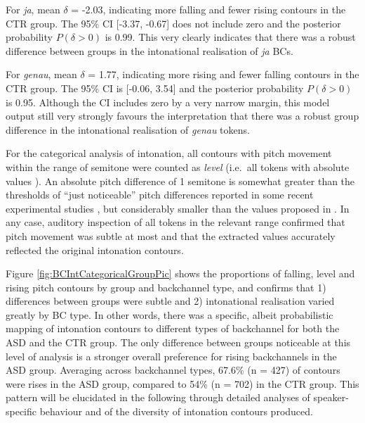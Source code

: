 For \emph{ja}, mean \(\delta\) = -2.03, indicating more falling and fewer rising contours in the CTR group. The 95\% CI {[}-3.37, -0.67{]} does not include zero and the posterior probability \(P(\delta > 0)\) is 0.99. This very clearly indicates that there was a robust difference between groups in the intonational realisation of \emph{ja} BCs.

For \emph{genau}, mean \(\delta\) = 1.77, indicating more rising and fewer falling contours in the CTR group. The 95\% CI is {[}-0.06, 3.54{]} and the posterior probability \(P(\delta > 0)\) is 0.95. Although the CI includes zero by a very narrow margin, this model output still very strongly favours the interpretation that there was a robust group difference in the intonational realisation of \emph{genau} tokens. 

\label{BCFP_BC_results_BCIntonation_categorical}


For the categorical analysis of intonation, all contours with pitch movement within the range of  semitone were counted as \textit{level} (i.e.~all tokens with absolute values ). An absolute pitch difference of 1 semitone is somewhat greater than the thresholds of ``just noticeable'' pitch differences reported in some recent experimental studies \citep{jongmanJustNoticeableDifferences2017,liuJustNoticeableDifference2013}, but considerably smaller than the values proposed in \citet{thartDifferentialSensitivityPitch1981}. In any case, auditory inspection of all tokens in the relevant range confirmed that pitch movement was subtle at most and that the extracted values accurately reflected the original intonation contours.

Figure \ref{fig:BCIntCategoricalGroupPic} shows the proportions of falling, level and rising pitch contours by group and backchannel type, and confirms that 1) differences between groups were subtle and 2) intonational realisation varied greatly by BC type. In other words, there was a specific, albeit probabilistic mapping of intonation contours to different types of backchannel for both the ASD and the CTR group. The only difference between groups noticeable at this level of analysis is a stronger overall preference for rising backchannels in the ASD group. Averaging across backchannel types, 67.6\% (n = 427) of contours were rises in the ASD group, compared to 54\% (n = 702) in the CTR group. This pattern will be elucidated in the following through detailed analyses of speaker-specific behaviour and of the diversity of intonation contours produced.



